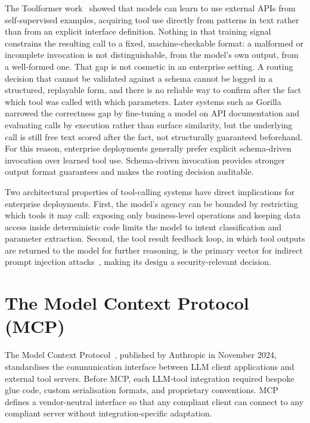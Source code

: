 The Toolformer work~\cite{schick2023toolformer} showed that models can learn to use external APIs from self-supervised examples, acquiring tool use directly from patterns in text rather than from an explicit interface definition. Nothing in that training signal constrains the resulting call to a fixed, machine-checkable format: a malformed or incomplete invocation is not distinguishable, from the model's own output, from a well-formed one. That gap is not cosmetic in an enterprise setting. A routing decision that cannot be validated against a schema cannot be logged in a structured, replayable form, and there is no reliable way to confirm after the fact which tool was called with which parameters. Later systems such as Gorilla~\cite{patil2023gorilla} narrowed the correctness gap by fine-tuning a model on API documentation and evaluating calls by execution rather than surface similarity, but the underlying call is still free text scored after the fact, not structurally guaranteed beforehand. For this reason, enterprise deployments generally prefer explicit schema-driven invocation over learned tool use. Schema-driven invocation provides stronger output format guarantees and makes the routing decision auditable.

Two architectural properties of tool-calling systems have direct implications for enterprise deployments. First, the model's agency can be bounded by restricting which tools it may call: exposing only business-level operations and keeping data access inside deterministic code limits the model to intent classification and parameter extraction. Second, the tool result feedback loop, in which tool outputs are returned to the model for further reasoning, is the primary vector for indirect prompt injection attacks~\cite{greshake2023not}, making its design a security-relevant decision.

\section{The Model Context Protocol (MCP)}
\label{sec:background_mcp}

The Model Context Protocol~\cite{anthropic2024mcp}, published by Anthropic in November 2024, standardises the communication interface between LLM client applications and external tool servers. Before MCP, each LLM-tool integration required bespoke glue code, custom serialisation formats, and proprietary conventions. MCP defines a vendor-neutral interface so that any compliant client can connect to any compliant server without integration-specific adaptation.

